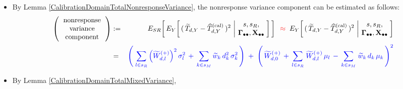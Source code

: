 \begin{itemize}
\begin{eqnarray*}
{        \cdot
        \widetilde{w}_{k}\,\widetilde{w}_{l}
        \cdot\!
        \left(\,
            \underset{i \in {\color{red}s_{M}} }{\sum}\,
            \rho_{ki}(s,\gdotdot)
            \cdot
            \rho_{li}(s,\gdotdot)
            \cdot
            d_{i}^{2}\,\sigma_{i}^{2}
            \,\right)
        }
    \end{eqnarray*}
\item
    By Lemma \ref{CalibrationDomainTotalNonresponseVariance},
    the nonresponse variance component can be estimated as follows:
    \begin{eqnarray*}
    \left(\!\begin{array}{c}
        \textnormal{nonresponse}
        \\
        \textnormal{variance}
        \\
        \textnormal{{\color{white}..}component{\color{white}..}}
        \end{array}\!\right)
    & := &
        E_{SR}\!\left[\,
        E_{Y}\!\left[\,
            (\,\widetilde{T}_{d,Y} - \widehat{T}^{\textnormal{(cal)}}_{d,Y}\,)^{2}
            \,\left\vert\!
            \begin{array}{c} s,s_{R}, \\ \Gdotdot,\Xobs \end{array}
            \right.
            \!\!\right]
            \,\right]
    \;\; {\color{red}\approx} \;\;
        E_{Y}\!\left[\,
            (\,\widetilde{T}_{d,Y} - \widehat{T}^{\textnormal{(cal)}}_{d,Y}\,)^{2}
            \,\left\vert\!
            \begin{array}{c} s,s_{R}, \\ \Gdotdot,\Xobs \end{array}
            \right.
            \!\!\right]
    \\
    & = &
        {\color{blue}
        \left(\;
            \underset{l \in s_{R}}{\sum}
                \left(\widetilde{W}^{(+)}_{d,l}\right)^{2}\sigma_{l}^{2}
            \,+\,
            \underset{k \in s_{M}}{\sum}\,
                \widetilde{w}_{k}\,d_{k}^{2}\,\sigma_{k}^{2}
            \,\right)
        \;+\;
        \left(\,
            \widetilde{W}^{(+)}_{d,0}
            \,+\,
            \underset{l \in s_{R}}{\sum}\;\widetilde{W}^{(+)}_{d,l}\,\mu_{l}
            \,-\,
            \underset{k \in s_{M}}{\sum}\;\widetilde{w}_{k}\,d_{k}\,\mu_{k}
            \,\right)^{2}
        }
    \end{eqnarray*}
\item
    By Lemma \ref{CalibrationDomainTotalMixedVariance},

\end{itemize}
